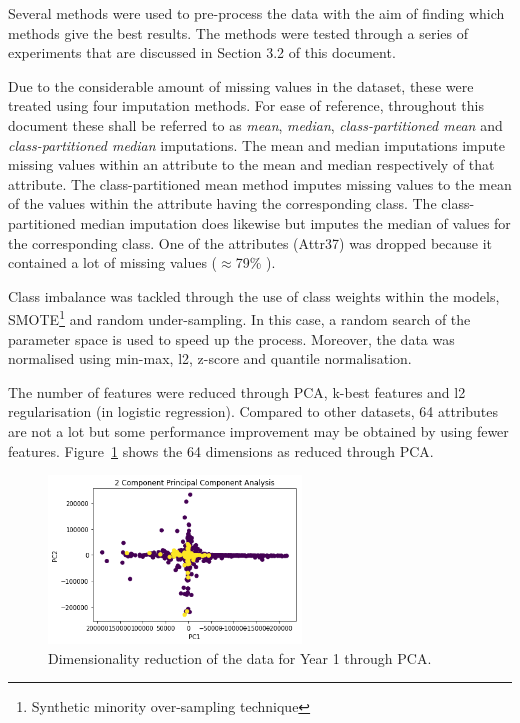 \documentclass{article}[paper=a4,pagesize=auto,10pt]
\begin{document}
Several methods were used to pre-process the data with the aim of finding which methods give the best results. The methods were tested through a series of experiments that are discussed in Section 3.2 of this document. \medskip

Due to the considerable amount of missing values in the dataset, these were treated using four imputation methods. For ease of reference, throughout this document these shall be referred to as \textit{mean}, \textit{median}, \textit{class-partitioned mean} and \textit{class-partitioned median} imputations. The mean and median imputations impute missing values within an attribute to the mean and median respectively of that attribute. The class-partitioned mean method imputes missing values to the mean of the values within the attribute having the corresponding class. The class-partitioned median imputation does likewise but imputes the median of values for the corresponding class. One of the attributes (Attr37) was dropped because it contained a lot of missing values ($\approx$79\% ).\medskip

Class imbalance was tackled through the use of class weights within the models, SMOTE\footnote{Synthetic minority over-sampling technique} and random under-sampling. In this case, a random search of the parameter space is used to speed up the process. Moreover, the data was normalised using min-max, l2, z-score and quantile normalisation.\medskip

The number of features were reduced through PCA, k-best features and l2 regularisation (in logistic regression). Compared to other datasets, 64 attributes are not a lot but some performance improvement may be obtained by using fewer features. Figure~\ref{fig:pca} shows the 64 dimensions as reduced through PCA.


\begin{figure}[!ht]
    \centering
	\includegraphics[width=0.6\textwidth]{graphics/pca2.png}
    \caption[Short Caption]{Dimensionality reduction of the data for Year 1 through PCA.}        
    \label{fig:pca}
\end{figure}
\end{document}
